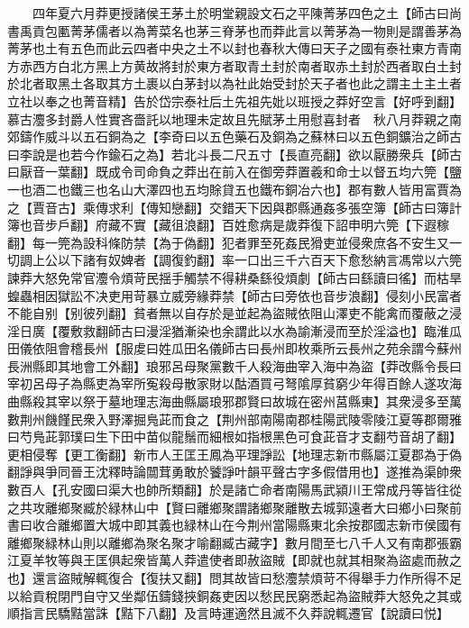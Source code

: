 　　四年夏六月莽更授諸侯王茅土於明堂親設文石之平陳菁茅四色之土【師古曰尚書禹貢包匭菁茅儒者以為菁菜名也茅三脊茅也而莽此言以菁茅為一物則是謂善茅為菁茅也土有五色而此云四者中央之土不以封也春秋大傳曰天子之國有泰社東方青南方赤西方白北方黑上方黄故將封於東方者取青土封於南者取赤土封於西者取白土封於北者取黑土各取其方土裹以白茅封以為社此始受封於天子者也此之謂主土主土者立社以奉之也菁音精】告於岱宗泰社后土先祖先妣以班授之莽好空言【好呼到翻】慕古灋多封爵人性實吝嗇託以地理未定故且先賦茅土用慰喜封者　秋八月莽親之南郊鑄作威斗以五石銅為之【李奇曰以五色藥石及銅為之蘇林曰以五色銅鑛治之師古曰李說是也若今作鍮石之為】若北斗長二尺五寸【長直亮翻】欲以厭勝衆兵【師古曰厭音一葉翻】既成令司命負之莽出在前入在御旁莽置羲和命士以督五均六筦【鹽一也酒二也鐵三也名山大澤四也五均賖貸五也鐵布銅冶六也】郡有數人皆用富賈為之【賈音古】乘傳求利【傳知戀翻】交錯天下因與郡縣通姦多張空簿【師古曰簿計簿也音步戶翻】府藏不實【藏徂浪翻】百姓愈病是歲莽復下詔申明六筦【下遐稼翻】每一筦為設科條防禁【為于偽翻】犯者罪至死姦民猾吏並侵衆庶各不安生又一切調上公以下諸有奴婢者【調復釣翻】率一口出三千六百天下愈愁納言馮常以六筦諫莽大怒免常官灋令煩苛民揺手觸禁不得耕桑繇役煩劇【師古曰繇讀曰徭】而枯旱蝗蟲相因獄訟不决吏用苛暴立威旁緣莽禁【師古曰旁依也音步浪翻】侵刻小民富者不能自别【别彼列翻】貧者無以自存於是並起為盜賊依阻山澤吏不能禽而覆蔽之浸淫日廣【覆敷救翻師古曰漫淫猶漸染也余謂此以水為諭漸浸而至於淫溢也】臨淮瓜田儀依阻會稽長州【服䖍曰姓瓜田名儀師古曰長州即枚乘所云長州之苑余謂今蘇州長洲縣即其地會工外翻】琅邪呂母聚黨數千人殺海曲宰入海中為盜【莽改縣令長曰宰初呂母子為縣吏為宰所寃殺母散家財以酤酒買弓弩隂厚貧窮少年得百餘人遂攻海曲縣殺其宰以祭于墓地理志海曲縣屬琅邪郡賢曰故城在密州莒縣東】其衆浸多至萬數荆州饑饉民衆入野澤掘鳬茈而食之【荆州部南陽南郡桂陽武陵零陵江夏等郡爾雅曰芍鳬茈郭璞曰生下田中苗似龍鬚而細根如指根黑色可食茈音才支翻芍音胡了翻】更相侵奪【更工衡翻】新市人王匡王鳳為平理諍訟【地理志新市縣屬江夏郡為于偽翻諍與爭同晉王沈釋時論闒茸勇敢於饕諍叶韻平聲古字多假借用也】遂推為渠帥衆數百人【孔安國曰渠大也帥所類翻】於是諸亡命者南陽馬武潁川王常成丹等皆往從之共攻離鄉聚臧於緑林山中【賢曰離鄉聚謂諸鄉聚離散去城郭遠者大曰鄉小曰聚前書曰收合離鄉置大城中即其義也緑林山在今荆州當陽縣東北余按郡國志新市侯國有離鄉聚緑林山則以離鄉為聚名聚才喻翻臧古藏字】數月間至七八千人又有南郡張霸江夏羊牧等與王匡俱起衆皆萬人莽遣使者即赦盜賊【即就也就其相聚為盜處而赦之也】還言盜賊解輒復合【復扶又翻】問其故皆曰愁灋禁煩苛不得舉手力作所得不足以給貢稅閉門自守又坐鄰伍鑄錢挾銅姦吏因以愁民民窮悉起為盜賊莽大怒免之其或順指言民驕黠當誅【黠下八翻】及言時運適然且滅不久莽說輒遷官【說讀曰悦】

